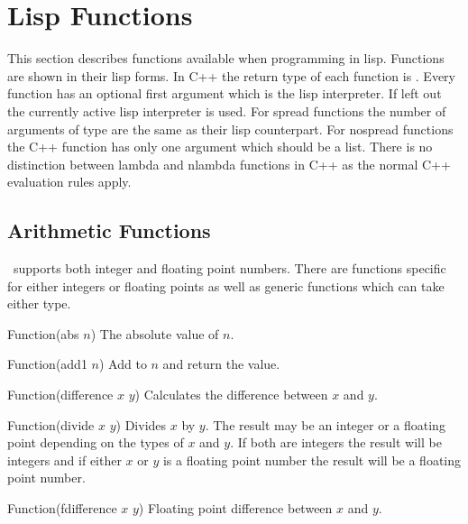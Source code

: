 \section{Lisp Functions}
\label{functions}
This section describes functions available when programming in lisp.
Functions are shown in their lisp forms.  In \textsf{C++} the return
type of each function is .  Every function has an optional
first argument which is the lisp interpreter.  If left out the
currently active lisp interpreter is used.  For spread functions the
number of arguments of type  are the same as their lisp
counterpart.  For nospread functions the \textsf{C++} function has
only one argument which should be a list.  There is no distinction
between lambda and nlambda functions in \textsf{C++} as the normal
\textsf{C++} evaluation rules apply.

\subsection{Arithmetic Functions}
\lips\ supports both integer and floating point numbers. There are
functions specific for either integers or floating points as well as
generic functions which can take either type.

\begin{defun}{Function}{(abs $n$)}
  The absolute value of $n$.
\end{defun}

\begin{defun}{Function}{(add1 $n$)}
  Add  to $n$ and return the value.
\end{defun}

\begin{defun}{Function}{(difference $x$ $y$)}
  Calculates the difference between $x$ and $y$.

\end{defun}

\begin{defun}{Function}{(divide $x$ $y$)}
  Divides $x$ by $y$. The result may be an integer or a floating point
  depending on the types of $x$ and $y$. If both are integers the
  result will be integers and if either $x$ or $y$ is a floating point
  number the result will be a floating point number.
\end{defun}

\begin{defun}{Function}{(fdifference $x$ $y$)}
  Floating point difference between $x$ and $y$.
\end{defun}

